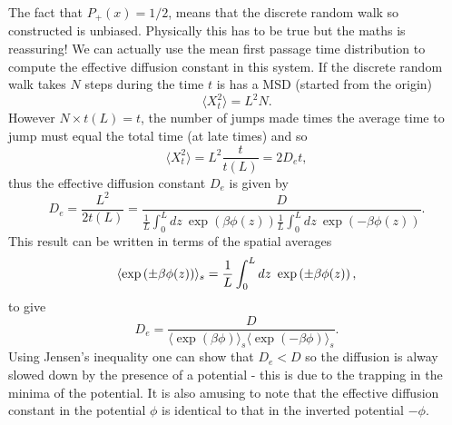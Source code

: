 \documentclass[11pt]{report}
\begin{document}
The fact that $P_+(x) = 1/2$, means that the discrete random walk so constructed is unbiased. Physically this has to be true but the maths is reassuring!
We can actually use the mean first passage time distribution to compute the effective diffusion constant in this system. If the discrete random walk takes $N$ steps during the time $t$ is has a MSD (started from the origin)
\begin{equation}
\langle X^2_t\rangle  = L^2 N.
\end{equation}
However $N\times t(L) = t$, the number of jumps made times the average time to jump
must equal the total time (at late times) and so
\begin{equation}
\langle X^2_t\rangle  = L^2 \frac{t}{t(L)} = 2D_e t,
\end{equation}
thus the effective diffusion constant $D_e$ is given by
\begin{equation}
\boxed{
D_e =\frac{L^2}{2t(L)} = \frac{D}{\frac{1}{L} \int_{0}^{L}dz\ \exp\left(\beta\phi(z)\right)\frac{1}{L} \int_{0}^{L}dz\ \exp\left(-\beta\phi(z)\right)}.}
\end{equation}
This result can be written in terms of the spatial averages
\begin{equation}
\langle \exp\left(\pm \beta\phi(z)\right)\rangle_s = {1\over L}\int_{0}^{L}dz\ \exp\left(\pm\beta\phi(z)\right),
\end{equation}
to give
\begin{equation}
D_e =\frac{D}{\langle \exp\left( \beta\phi\right)\rangle_s \langle \exp\left( -\beta\phi\right)\rangle_s}.\label{1dpotf}
\end{equation}
Using Jensen's inequality one can show that $D_e < D$ so the diffusion is alway slowed
down by the presence of a potential  - this is due to the trapping in the minima of the potential. It is also amusing to note that the effective diffusion constant in the potential $\phi$ is identical to that in the inverted potential $-\phi$. 
\end{document}
